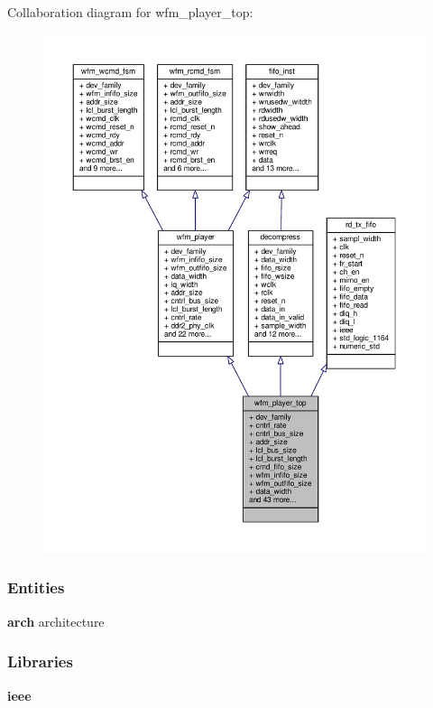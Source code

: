 Collaboration diagram for wfm\+\_\+player\+\_\+top\+:\nopagebreak
\begin{figure}[H]
\begin{center}
\leavevmode
\includegraphics[width=350pt]{d5/dc5/classwfm__player__top__coll__graph}
\end{center}
\end{figure}
\subsubsection*{Entities}
\begin{DoxyCompactItemize}
\item 
{\bf arch} architecture
\end{DoxyCompactItemize}
\subsubsection*{Libraries}
 \begin{DoxyCompactItemize}
\item 
{\bf ieee} 
\end{DoxyCompactItemize}
